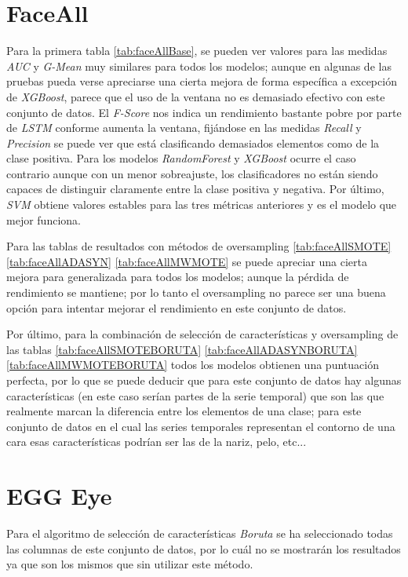 \section{FaceAll}
Para la primera tabla \ref{tab:faceAllBase}, se pueden ver valores para las medidas \textit{AUC} y \textit{G-Mean} muy similares para todos los modelos; aunque en algunas de las pruebas pueda verse apreciarse una cierta mejora de forma específica a excepción de \textit{XGBoost}, parece que el uso de la ventana no es demasiado efectivo con este conjunto de datos. El \textit{F-Score} nos indica un rendimiento bastante pobre por parte de \textit{LSTM} conforme aumenta la ventana, fijándose en las medidas \textit{Recall} y \textit{Precision} se puede ver que está clasificando demasiados elementos como de la clase positiva. Para los modelos \textit{RandomForest} y \textit{XGBoost} ocurre el caso contrario aunque con un menor sobreajuste, los clasificadores no están siendo capaces de distinguir claramente entre la clase positiva y negativa. Por último, \textit{SVM} obtiene valores estables para las tres métricas anteriores y es el modelo que mejor funciona.\newline

Para las tablas de resultados con métodos de oversampling \ref{tab:faceAllSMOTE} \ref{tab:faceAllADASYN} \ref{tab:faceAllMWMOTE} se puede apreciar una cierta mejora para generalizada para todos los modelos; aunque la pérdida de rendimiento se mantiene; por lo tanto el oversampling no parece ser una buena opción para intentar mejorar el rendimiento en este conjunto de datos.

Por último, para la combinación de selección de características y oversampling de las tablas \ref{tab:faceAllSMOTEBORUTA} \ref{tab:faceAllADASYNBORUTA} \ref{tab:faceAllMWMOTEBORUTA} todos los modelos obtienen una puntuación perfecta, por lo que se puede deducir que para este conjunto de datos hay algunas características (en este caso serían partes de la serie temporal) que son las que realmente marcan la diferencia entre los elementos de una clase; para este conjunto de datos en el cual las series temporales representan el contorno de una cara esas características podrían ser las de la nariz, pelo, etc...

\section{EGG Eye}

Para el algoritmo de selección de características \textit{Boruta} se ha  seleccionado todas las columnas de este conjunto de datos, por lo cuál no se mostrarán los resultados ya que son los mismos que sin utilizar este método.\newline

